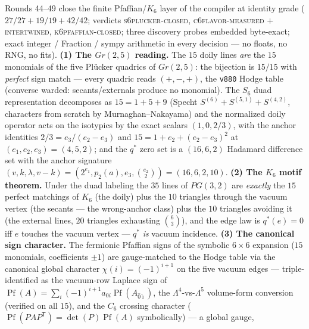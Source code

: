 \documentclass[11pt,a4paper]{article}
\theoremstyle{definition}
\begin{document}
\begin{keybox}
Rounds 44--49 close the finite Pfaffian/$K_6$ layer of the
compiler at identity grade ($27/27 + 19/19 + 42/42$; verdicts
\textsc{s6plucker-closed}, \textsc{c6flavor-measured} $+$
\textsc{intertwined}, \textsc{k6pfaffian-closed}; three
discovery probes embedded byte-exact; exact integer / Fraction /
sympy arithmetic in every decision --- no floats, no RNG, no
fits).  \textbf{(1) The $Gr(2,5)$ reading.}  The $15$ doily
lines \emph{are} the $15$ monomials of the five Pl\"ucker
quadrics of $Gr(2,5)$: the bijection is $15/15$ with
\emph{perfect} sign match --- every quadric reads $(+,-,+)$,
the \texttt{v880} Hodge table (converse warded:
secants/externals produce no monomial).  The $S_6$ duad
representation decomposes as $15 = 1 + 5 + 9$ (Specht
$S^{(6)} + S^{(5,1)} + S^{(4,2)}$, characters from scratch by
Murnaghan--Nakayama) and the normalized doily operator acts on
the isotypics by the exact scalars $(1, 0, 2/3)$, with the
anchor identities $2/3 = e_3/(e_2 - e_3)$ and $15 = 1 + e_2 +
(e_2 - e_3)^2$ at $(e_1, e_2, e_3) = (4, 5, 2)$; and the
$q^{*}$ zero set is a $(16, 6, 2)$ Hadamard difference set with
the anchor signature $(v, k, \lambda, v - k) = (2^{e_1},
p_2(a), e_3, \binom{e_2}{2}) = (16, 6, 2, 10)$.  \textbf{(2)
The $K_6$ motif theorem.}  Under the duad labeling the $35$
lines of $PG(3,2)$ are \emph{exactly} the $15$ perfect
matchings of $K_6$ (the doily) plus the $10$ triangles through
the vacuum vertex (the secants --- the wrong-anchor class) plus
the $10$ triangles avoiding it (the external lines, $20$
triangles exhausting $\binom{6}{3}$), and the edge law is
$q^{*}(e) = 0$ iff $e$ touches the vacuum vertex --- $q^{*}$
\emph{is} vacuum incidence.  \textbf{(3) The canonical sign
character.}  The fermionic Pfaffian signs of the symbolic
$6\times6$ expansion ($15$ monomials, coefficients $\pm1$) are
gauge-matched to the Hodge table via the canonical global
character $\chi(i) = (-1)^{i+1}$ on the five vacuum edges ---
triple-identified as the vacuum-row Laplace sign of
$\operatorname{Pf}(A) = \sum_i (-1)^{i+1} a_{0i}
\operatorname{Pf}(A_{\hat{0}\hat{\imath}})$, the
$\Lambda^4$-vs-$\Lambda^5$ volume-form conversion (verified on
all $15$), and the $C_6$ crossing character
($\operatorname{Pf}(PAP^{\mathsf T}) =
\det(P)\operatorname{Pf}(A)$ symbolically) --- a global gauge,

\end{keybox}
\end{document}
